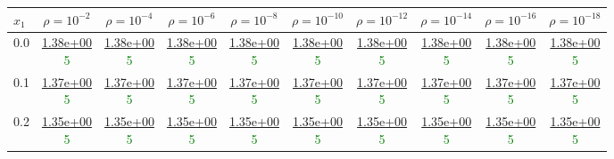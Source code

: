 \begin{table}[H]
\centering
\footnotesize
\begin{tabular}{|l||c|c|c|c|c|c|c|c|c|}
\toprule
$x_1$ & $\rho=10^{-2}$ & $\rho=10^{-4}$ & $\rho=10^{-6}$ & $\rho=10^{-8}$ & $\rho=10^{-10}$ & $\rho=10^{-12}$ & $\rho=10^{-14}$ & $\rho=10^{-16}$ & $\rho=10^{-18}$ \\
\midrule \midrule
0.0 & \makecell{\ul{1.38e+00} \\ \textcolor{Green}{5}} & \makecell{\ul{1.38e+00} \\ \textcolor{Green}{5}} & \makecell{\ul{1.38e+00} \\ \textcolor{Green}{5}} & \makecell{\ul{1.38e+00} \\ \textcolor{Green}{5}} & \makecell{\ul{1.38e+00} \\ \textcolor{Green}{5}} & \makecell{\ul{1.38e+00} \\ \textcolor{Green}{5}} & \makecell{\ul{1.38e+00} \\ \textcolor{Green}{5}} & \makecell{\ul{1.38e+00} \\ \textcolor{Green}{5}} & \makecell{\ul{1.38e+00} \\ \textcolor{Green}{5}} \\
\hline
 0.1 & \makecell{\ul{1.37e+00} \\ \textcolor{Green}{5}} & \makecell{\ul{1.37e+00} \\ \textcolor{Green}{5}} & \makecell{\ul{1.37e+00} \\ \textcolor{Green}{5}} & \makecell{\ul{1.37e+00} \\ \textcolor{Green}{5}} & \makecell{\ul{1.37e+00} \\ \textcolor{Green}{5}} & \makecell{\ul{1.37e+00} \\ \textcolor{Green}{5}} & \makecell{\ul{1.37e+00} \\ \textcolor{Green}{5}} & \makecell{\ul{1.37e+00} \\ \textcolor{Green}{5}} & \makecell{\ul{1.37e+00} \\ \textcolor{Green}{5}} \\
\hline
 0.2 & \makecell{\ul{1.35e+00} \\ \textcolor{Green}{5}} & \makecell{\ul{1.35e+00} \\ \textcolor{Green}{5}} & \makecell{\ul{1.35e+00} \\ \textcolor{Green}{5}} & \makecell{\ul{1.35e+00} \\ \textcolor{Green}{5}} & \makecell{\ul{1.35e+00} \\ \textcolor{Green}{5}} & \makecell{\ul{1.35e+00} \\ \textcolor{Green}{5}} & \makecell{\ul{1.35e+00} \\ \textcolor{Green}{5}} & \makecell{\ul{1.35e+00} \\ \textcolor{Green}{5}} & \makecell{\ul{1.35e+00} \\ \textcolor{Green}{5}} \\

\end{tabular}
\end{table}
